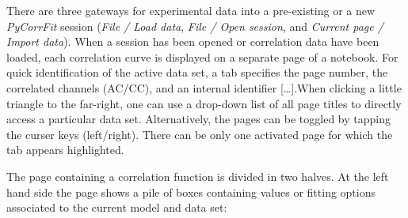 There are three gateways for experimental data into a pre-existing or a new \textit{PyCorrFit} session (\textit{File / Load data}, \textit{File / Open session}, and \textit{Current page / Import data}). When a session has been opened or correlation data have been loaded, each correlation curve is displayed on a separate page of a notebook. For quick identification of the active data set, a tab specifies the page number, the correlated channels (AC/CC), and an internal identifier […].When clicking a little triangle to the far-right, one can use a drop-down list of all page titles to directly access a particular data set. Alternatively, the pages can be toggled by tapping the curser keys (left/right). There can be only one activated page for which the tab appears highlighted.

The page containing a correlation function is divided in two halves. At the left hand side the page\textit{ }shows a pile of boxes containing values or fitting options associated to the current model and data set: 

